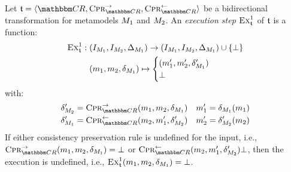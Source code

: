 \begin{definition}
    Let $\transformation{t} = \tupled{\consistencyrelationset{CR}, \consistencypreservationrule{\consistencyrelationset{CR}}^{\rightarrow}, \consistencypreservationrule{\consistencyrelationset{CR}}^{\leftarrow}}$ be a bidirectional transformation for metamodels $M_{1}$ and $M_{2}$.
    An \emph{execution step} $\textsc{Ex}_{\mathfrak{t}}^1$ of $\mathfrak{t}$ is a function:
    \begin{align*}
        \textsc{Ex}_{\mathfrak{t}}^1 : \; & (I_{M_{1}}, I_{M_{2}}, \Delta_{M_{1}}) \rightarrow (I_{M_{1}}, I_{M_{2}}, \Delta_{M_{1}}) \cup \{ \bot \} \\
        & (m_{1}, m_{2}, \delta_{M_{1}}) \mapsto 
        \begin{cases} 
            (m_{1}', m_{2}', \delta_{M_{1}}') \\
            \bot
        \end{cases}
    \end{align*}
    with:
    \begin{align*}
        & \change{\metamodel{M}{2}}' = \consistencypreservationrule{\consistencyrelationset{CR}}^{\rightarrow}(\model{m}{1}, \model{m}{2}, \change{\metamodel{M}{1}}) %
        & \model{m}{1}' = \change{\metamodel{M}{1}}(\model{m}{1}) \\
        & \change{\metamodel{M}{1}}' = \consistencypreservationrule{\consistencyrelationset{CR}}^{\leftarrow}(\model{m}{2}, \model{m}{1}', \change{\metamodel{M}{2}}') %
        & \model{m}{2}' = \change{\metamodel{M}{2}}'(\model{m}{2})
    \end{align*}
    If either consistency preservation rule is undefined for the input, i.e., $\consistencypreservationrule{\consistencyrelationset{CR}}^{\rightarrow}(\model{m}{1}, \model{m}{2}, \change{\metamodel{M}{1}}) = \bot$ or $\consistencypreservationrule{\consistencyrelationset{CR}}^{\leftarrow}(\model{m}{2}, \model{m}{1}', \change{\metamodel{M}{2}}') \bot$, then the execution is undefined, i.e., $\textsc{Ex}_{\mathfrak{t}}^1(m_{1}, m_{2}, \delta_{M_{1}}) = \bot$.

\end{definition}
